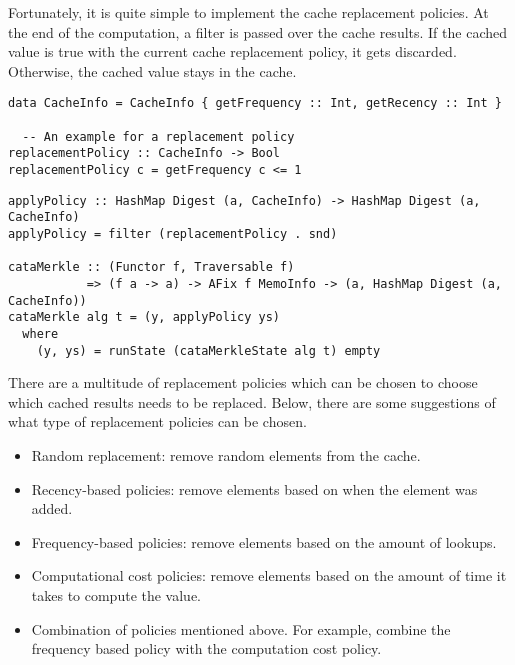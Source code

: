 Fortunately, it is quite simple to implement the cache replacement policies. At the end of the  computation, a filter is passed over the cache results. If the cached value is true with the current cache replacement policy, it gets discarded. Otherwise, the cached value stays in the cache. 

\begin{verbatim}
data CacheInfo = CacheInfo { getFrequency :: Int, getRecency :: Int }
  
  -- An example for a replacement policy
replacementPolicy :: CacheInfo -> Bool
replacementPolicy c = getFrequency c <= 1
\end{verbatim}

\begin{verbatim}
applyPolicy :: HashMap Digest (a, CacheInfo) -> HashMap Digest (a, CacheInfo)
applyPolicy = filter (replacementPolicy . snd)

cataMerkle :: (Functor f, Traversable f) 
           => (f a -> a) -> AFix f MemoInfo -> (a, HashMap Digest (a, CacheInfo))
cataMerkle alg t = (y, applyPolicy ys)
  where
    (y, ys) = runState (cataMerkleState alg t) empty
\end{verbatim}

There are a multitude of replacement policies which can be chosen to choose which cached results needs to be replaced. Below, there are some suggestions of what type of replacement policies can be chosen.
\begin{itemize}
  \item Random replacement: remove random elements from the cache.
  \item Recency-based policies: remove elements based on when the element was added.
  \item Frequency-based policies: remove elements based on the amount of lookups.
  \item Computational cost policies: remove elements based on the amount of time it takes to compute the value.
  \item Combination of policies mentioned above. For example, combine the frequency based policy with the computation cost policy.
\end{itemize}